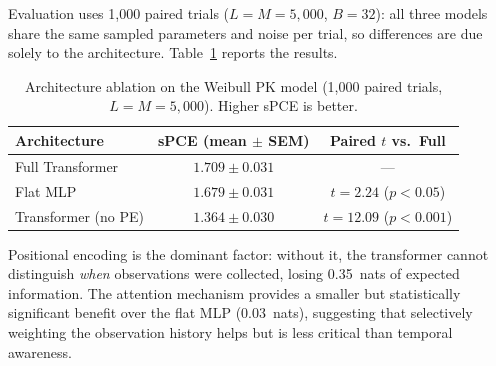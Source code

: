 Evaluation uses 1{,}000 paired trials ($L{=}M{=}5{,}000$, $B{=}32$): all three models share the same sampled parameters and noise per trial, so differences are due solely to the architecture. Table~\ref{tab:ablation} reports the results.

\begin{table}[t]
\centering
\caption{Architecture ablation on the Weibull PK model (1{,}000 paired trials, $L{=}M{=}5{,}000$). Higher sPCE is better.}
\label{tab:ablation}
\small
\begin{tabular}{@{}lcc@{}}
\hline
Architecture & sPCE (mean $\pm$ SEM) & Paired $t$ vs.\ Full \\
\hline
Full Transformer      & $1.709 \pm 0.031$ & --- \\
Flat MLP              & $1.679 \pm 0.031$ & $t = 2.24$ ($p < 0.05$) \\
Transformer (no PE)   & $1.364 \pm 0.030$ & $t = 12.09$ ($p < 0.001$) \\
\hline
\end{tabular}
\end{table}

Positional encoding is the dominant factor: without it, the transformer cannot distinguish \emph{when} observations were collected, losing 0.35~nats of expected information. The attention mechanism provides a smaller but statistically significant benefit over the flat MLP (0.03~nats), suggesting that selectively weighting the observation history helps but is less critical than temporal awareness.
